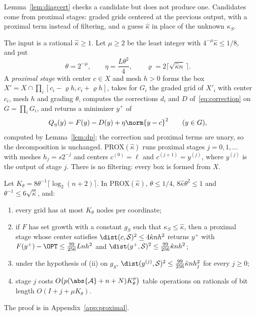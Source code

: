 Lemma~\ref{lem:diagcert} checks a candidate but does not produce one.
Candidates come from proximal stages: graded grids centered at the previous
output, with a proximal term instead of filtering, and a guess $\hat\kappa$
in place of the unknown $\kappa_S$.

\begin{algorithm}\label{alg:prox}
The input is a rational $\hat\kappa\ge1$. Let $\mu\ge2$ be the least integer
with $4^{-\mu}\hat\kappa\le1/8$, and put
\[
\theta=2^{-\mu},\qquad\eta=\frac{L\theta^2}4,\qquad
\varrho=2\bigl\lceil\sqrt{\hat\kappa n}\,\bigr\rceil .
\]
A \emph{proximal stage} with center $c\in X$ and mesh $h>0$ forms the box
$X'=X\cap\prod_i[c_i-\varrho h,c_i+\varrho h]$, takes for $G_i$ the graded
grid of $X'_i$ with center $c_i$, mesh $h$ and grading $\theta$, computes the
corrections $d_i$ and $D$ of~\eqref{eq:correction} on $G=\prod_iG_i$, and
returns a minimizer $y^+$ of
\[
Q_\eta(y)=F(y)-D(y)+\eta\norm{y-c}^2\qquad(y\in G),
\]
computed by Lemma~\ref{lem:dp}; the correction and proximal terms are unary,
so the decomposition is unchanged. PROX$(\hat\kappa)$ runs proximal stages
$j=0,1,\dots$ with meshes $h_j=s2^{-j}$ and centers $c^{(0)}=\ell$ and
$c^{(j+1)}=y^{(j)}$, where $y^{(j)}$ is the output of stage $j$. There is no
filtering: every box is formed from $X$.
\end{algorithm}

\begin{lemma}\label{lem:proximal}
Let $K_\theta=8\theta^{-1}\lceil\log_2(n+2)\rceil$. In PROX$(\hat\kappa)$,
$\theta\le1/4$, $8\hat\kappa\theta^2\le1$ and $\theta^{-1}\le6\sqrt{\hat\kappa}$,
and:
\begin{enumerate}[label=(\roman*)]
\item every grid has at most $K_\theta$ nodes per coordinate;
\item if $F$ has set growth with a constant $g_S$ such that
$\kappa_S\le\hat\kappa$, then a proximal stage whose center satisfies
$\dist(c,\mathcal S)^2\le4\hat\kappa nh^2$ returns $y^+$ with
$F(y^+)-\OPT\le\frac{99}{256}Lnh^2$ and
$\dist(y^+,\mathcal S)^2\le\frac{99}{256}\hat\kappa nh^2$;
\item under the hypothesis of (ii) on $g_S$,
$\dist(y^{(j)},\mathcal S)^2\le\frac{99}{256}\hat\kappa nh_j^2$ for every
$j\ge0$;
\item stage $j$ costs $O\bigl(p(\abs{\mathcal A}+n+N)K_\theta^p\bigr)$ table
operations on rationals of bit length $O(I+j+\mu K_\theta)$.
\end{enumerate}
The proof is in Appendix~\ref{app:proximal}.
\end{lemma}

